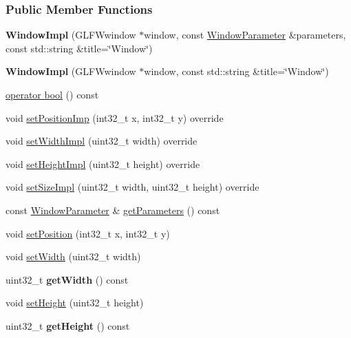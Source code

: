 \subsubsection*{Public Member Functions}
\begin{DoxyCompactItemize}
\item 
{\bfseries Window\+Impl} (G\+L\+F\+Wwindow $\ast$window, const \hyperlink{a00091}{Window\+Parameter} \&parameters, const std\+::string \&title=\char`\"{}Window\char`\"{})\hypertarget{a00084_a283f89ad5cd08b0ae888fb6ce2374c4c}{}\label{a00084_a283f89ad5cd08b0ae888fb6ce2374c4c}

\item 
{\bfseries Window\+Impl} (G\+L\+F\+Wwindow $\ast$window, const std\+::string \&title=\char`\"{}Window\char`\"{})\hypertarget{a00084_a61401c4173b8da3306e5186234703ed1}{}\label{a00084_a61401c4173b8da3306e5186234703ed1}

\item 
\hyperlink{a00084_a6bd72585d8e7376ae77fd1df993a7d42}{operator bool} () const 
\item 
void \hyperlink{a00084_af52abedfc7695f94f32167d52e501b3d}{set\+Position\+Imp} (int32\+\_\+t x, int32\+\_\+t y) override
\item 
void \hyperlink{a00084_a2a42c1ce8e90c3adef80e5973b91bb38}{set\+Width\+Impl} (uint32\+\_\+t width) override
\item 
void \hyperlink{a00084_a877ca64eee45c4f5abc766c4164e316c}{set\+Height\+Impl} (uint32\+\_\+t height) override
\item 
void \hyperlink{a00084_a226cde7add1fb27044e3eccd167f361f}{set\+Size\+Impl} (uint32\+\_\+t width, uint32\+\_\+t height) override
\item 
const \hyperlink{a00091}{Window\+Parameter} \& \hyperlink{a00082_afbb0f8b825f17fbf8f434c4ab9ae5f8d}{get\+Parameters} () const 
\item 
void \hyperlink{a00082_ad6874b68c5cd0b59ec75ac8ad15f2a3a}{set\+Position} (int32\+\_\+t x, int32\+\_\+t y)
\item 
void \hyperlink{a00082_a3435c3bf0e07492ec77f3977c9b5e355}{set\+Width} (uint32\+\_\+t width)
\item 
uint32\+\_\+t {\bfseries get\+Width} () const \hypertarget{a00082_a8f13b82e3aa16ac711b2efd5411964d0}{}\label{a00082_a8f13b82e3aa16ac711b2efd5411964d0}

\item 
void \hyperlink{a00082_a87b8b6f2c1a08327d4010e2b6aceb319}{set\+Height} (uint32\+\_\+t height)
\item 
uint32\+\_\+t {\bfseries get\+Height} () const \hypertarget{a00082_accdce871efc461fe3348d62f8087b73d}{}\label{a00082_accdce871efc461fe3348d62f8087b73d}


\end{DoxyCompactItemize}

